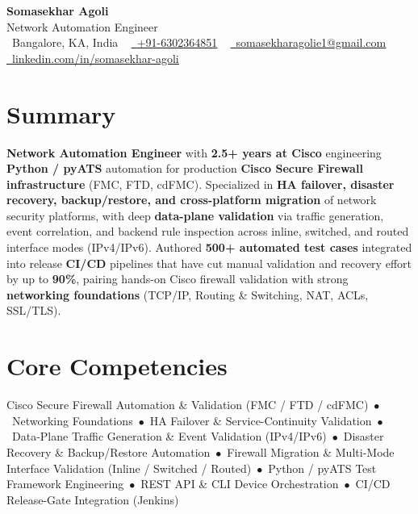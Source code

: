 \documentclass[letterpaper,11pt]{article}
\begin{document}




\begin{center}
    {\Huge \bfseries \color{name} Somasekhar Agoli} \\[3pt]
    {\large \color{tagline} Network Automation Engineer} \\[5pt]
    \small
    \raisebox{-0.1\height}\faMapMarker\ Bangalore, KA, India ~
    \href{tel:+916302364851}{\raisebox{-0.1\height}\faPhone\ \underline{+91-6302364851}} ~
    \href{mailto:somasekharagolie1@gmail.com}{\raisebox{-0.2\height}\faEnvelope\ \underline{somasekharagolie1@gmail.com}} ~
    \href{https://www.linkedin.com/in/somasekhar-agoli/}{\raisebox{-0.2\height}\faLinkedinSquare\ \underline{linkedin.com/in/somasekhar-agoli}}
\end{center}


\section{Summary}
\textbf{Network Automation Engineer} with \textbf{2.5+ years at Cisco} engineering \textbf{Python / pyATS} automation for production \textbf{Cisco Secure Firewall infrastructure} (FMC, FTD, cdFMC). Specialized in \textbf{HA failover, disaster recovery, backup/restore, and cross-platform migration} of network security platforms, with deep \textbf{data-plane validation} via traffic generation, event correlation, and backend rule inspection across inline, switched, and routed interface modes (IPv4/IPv6). Authored \textbf{500+ automated test cases} integrated into release \textbf{CI/CD} pipelines that have cut manual validation and recovery effort by up to \textbf{90\%}, pairing hands-on Cisco firewall validation with strong \textbf{networking foundations} (TCP/IP, Routing \& Switching, NAT, ACLs, SSL/TLS).

\section{Core Competencies}
\small
Cisco Secure Firewall Automation \& Validation (FMC / FTD / cdFMC)~$\bullet$~Networking Foundations~$\bullet$~HA Failover \& Service-Continuity Validation~$\bullet$~Data-Plane Traffic Generation \& Event Validation (IPv4/IPv6)~$\bullet$~Disaster Recovery \& Backup/Restore Automation~$\bullet$~Firewall Migration \& Multi-Mode Interface Validation (Inline / Switched / Routed)~$\bullet$~Python / pyATS Test Framework Engineering~$\bullet$~REST API \& CLI Device Orchestration~$\bullet$~CI/CD Release-Gate Integration (Jenkins)
\vspace{4pt}
\end{document}
